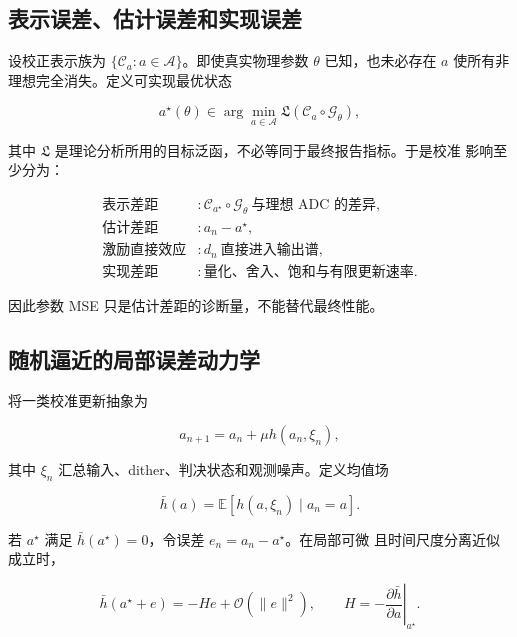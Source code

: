 \documentclass[11pt,a4paper]{ctexart}
\newcommand{\E}{\mathbb{E}}
\theoremstyle{adcplain}
\theoremstyle{definition}
\begin{document}
\subsection{表示误差、估计误差和实现误差}

设校正表示族为 $\{\mathcal C_a:a\in\mathcal A\}$。即使真实物理参数
$\theta$ 已知，也未必存在 $a$ 使所有非理想完全消失。定义可实现最优状态

\begin{equation}
  a^\star(\theta)
  \in
  \arg\min_{a\in\mathcal A}
  \mathfrak L\!\left(
    \mathcal C_a\circ\mathcal G_\theta
  \right),
  \label{eq:oracle-state}
\end{equation}

其中 $\mathfrak L$ 是理论分析所用的目标泛函，不必等同于最终报告指标。于是校准
影响至少分为：

\begin{align}
  \text{表示差距}&:
  \mathcal C_{a^\star}\circ\mathcal G_\theta
  \ \text{与理想 ADC 的差异},\\
  \text{估计差距}&:
  a_n-a^\star,\\
  \text{激励直接效应}&:
  d_n\ \text{直接进入输出谱},\\
  \text{实现差距}&:
  \text{量化、舍入、饱和与有限更新速率}.
\end{align}

因此参数 MSE 只是估计差距的诊断量，不能替代最终性能。

\subsection{随机逼近的局部误差动力学}

将一类校准更新抽象为

\begin{equation}
  a_{n+1}
  =
  a_n+\mu h(a_n,\xi_n),
  \label{eq:sa-general}
\end{equation}

其中 $\xi_n$ 汇总输入、dither、判决状态和观测噪声。定义均值场

\begin{equation}
  \bar h(a)=\E[h(a,\xi_n)\mid a_n=a].
\end{equation}

若 $a^\star$ 满足 $\bar h(a^\star)=0$，令误差 $e_n=a_n-a^\star$。在局部可微
且时间尺度分离近似成立时，

\begin{equation}
  \bar h(a^\star+e)
  =
  -He+\mathcal O(\|e\|^2),
  \qquad
  H=-\left.\frac{\partial\bar h}{\partial a}\right|_{a^\star}.
\end{equation}
\end{document}
